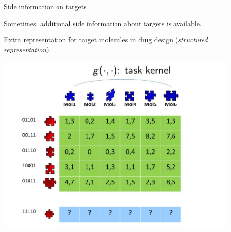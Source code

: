 \documentclass[11pt,compress,t,notes=noshow, xcolor=table]{beamer}
\begin{document}
\begin{vbframe}{Side information on targets}
    \begin{itemize}
        \item Sometimes, additional side information about targets is available.
            \begin{minipage}{0.45\textwidth}    
                \item Extra representation for target molecules in drug design (\emph{structured representation}).
            \end{minipage}
            \hfill
            \begin{minipage}{0.4\textwidth}    
                \begin{center}
                    \includegraphics[width=0.9\textwidth,trim = 0 0 50 80,clip]{figure/Slide4}	
                \end{center}
            \end{minipage}
            

\end{itemize}
\end{vbframe}
\end{document}
